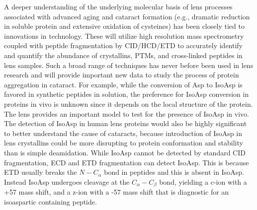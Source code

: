 \documentclass[arial,11pt]{article}
\newcommand{\NeedRevision}[1]{\textcolor{red}{#1}}
\begin{document}

A deeper understanding of the underlying molecular basis of lens processes associated with advanced aging and cataract formation (e.g., dramatic reduction in soluble protein and extensive oxidation of cysteines) has been closely tied to innovations in technology. 
These will utilize high resolution mass spectrometry coupled with peptide fragmentation by CID/HCD/ETD to accurately identify and quantify the abundance of crystallins, PTMs,  and cross-linked peptides in lens samples. 
Such a broad range of techniques has never before been used in lens research and will provide important new data to study the process of protein aggregation in cataract. For example, while the conversion of Asp to IsoAsp is favored in synthetic peptides in solution, the preference for IsoAsp conversion in proteins in vivo is unknown since it depends on the local structure of the protein.  The lens provides an  important model to test for the presence of IsoAsp in vivo.  The detection of IsoAsp in human lens proteins would also be highly significant to better understand the cause of cataracts, because introduction of IsoAsp in lens crystallins could be more disrupting to protein conformation and stability than is simple deamidation. While IsoAsp cannot be detected by standard CID fragmentation, ECD and ETD fragmentation can detect IsoAsp. This is because ETD usually breaks the $N-C_\alpha$ bond in peptides and this is absent in IsoAsp.  Instead IsoAsp undergoes cleavage at the $C_\alpha-C_\beta$ bond, yielding a c-ion with a +57 mass shift, and a z-ion with a -57 mass shift that is diagnostic for an isoaspartic containing peptide.

\end{document}
